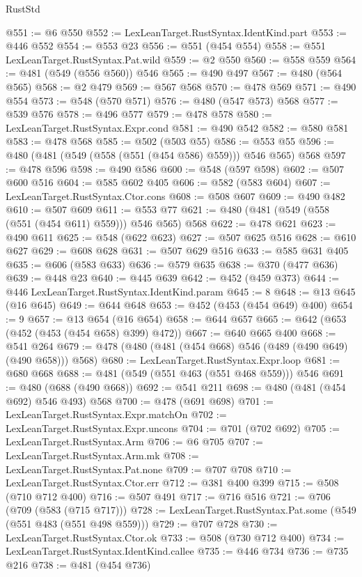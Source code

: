 \begin{lexlean}{RustStd}
\begin{coremodule}
@551 := @6 @550
@552 := LexLeanTarget.RustSyntax.IdentKind.part
@553 := @446 @552
@554 := @553 @23
@556 := @551 (@454 @554)
@558 := @551 LexLeanTarget.RustSyntax.Pat.wild
@559 := @2 @550
@560 := @558 @559
@564 := @481 (@549 (@556 @560)) @546
@565 := @490 @497
@567 := @480 (@564 @565)
@568 := @2 @479
@569 := @567 @568
@570 := @478 @569
@571 := @490 @554
@573 := @548 (@570 @571)
@576 := @480 (@547 @573) @568
@577 := @539 @576
@578 := @496 @577
@579 := @478 @578
@580 := LexLeanTarget.RustSyntax.Expr.cond
@581 := @490 @542
@582 := @580 @581
@583 := @478 @568
@585 := @502 (@503 @55)
@586 := @553 @55
@596 := @480 (@481 (@549 (@558 (@551 (@454 @586) @559))) @546 @565) @568
@597 := @478 @596
@598 := @490 @586
@600 := @548 (@597 @598)
@602 := @507 @600 @516
@604 := @585 @602 @405
@606 := @582 (@583 @604)
@607 := LexLeanTarget.RustSyntax.Ctor.cons
@608 := @508 @607
@609 := @490 @482
@610 := @507 @609
@611 := @553 @77
@621 := @480 (@481 (@549 (@558 (@551 (@454 @611) @559))) @546 @565) @568
@622 := @478 @621
@623 := @490 @611
@625 := @548 (@622 @623)
@627 := @507 @625 @516
@628 := @610 @627
@629 := @608 @628
@631 := @507 @629 @516
@633 := @585 @631 @405
@635 := @606 (@583 @633)
@636 := @579 @635
@638 := @370 (@477 @636)
@639 := @448 @23
@640 := @445 @639
@642 := @452 (@459 @373)
@644 := @446 LexLeanTarget.RustSyntax.IdentKind.param
@645 := 8
@648 := @13 @645 (@16 @645)
@649 := @644 @648
@653 := @452 (@453 (@454 @649) @400)
@654 := 9
@657 := @13 @654 (@16 @654)
@658 := @644 @657
@665 := @642 (@653 (@452 (@453 (@454 @658) @399) @472))
@667 := @640 @665 @400
@668 := @541 @264
@679 := @478 (@480 (@481 (@454 @668) @546 (@489 (@490 @649) (@490 @658))) @568)
@680 := LexLeanTarget.RustSyntax.Expr.loop
@681 := @680 @668
@688 := @481 (@549 (@551 @463 (@551 @468 @559))) @546
@691 := @480 (@688 (@490 @668))
@692 := @541 @211
@698 := @480 (@481 (@454 @692) @546 @493) @568
@700 := @478 (@691 @698)
@701 := LexLeanTarget.RustSyntax.Expr.matchOn
@702 := LexLeanTarget.RustSyntax.Expr.uncons
@704 := @701 (@702 @692)
@705 := LexLeanTarget.RustSyntax.Arm
@706 := @6 @705
@707 := LexLeanTarget.RustSyntax.Arm.mk
@708 := LexLeanTarget.RustSyntax.Pat.none
@709 := @707 @708
@710 := LexLeanTarget.RustSyntax.Ctor.err
@712 := @381 @400 @399
@715 := @508 (@710 @712 @400)
@716 := @507 @491
@717 := @716 @516
@721 := @706 (@709 (@583 (@715 @717)))
@728 := LexLeanTarget.RustSyntax.Pat.some (@549 (@551 @483 (@551 @498 @559)))
@729 := @707 @728
@730 := LexLeanTarget.RustSyntax.Ctor.ok
@733 := @508 (@730 @712 @400)
@734 := LexLeanTarget.RustSyntax.IdentKind.callee
@735 := @446 @734
@736 := @735 @216
@738 := @481 (@454 @736)

\end{coremodule}
\end{lexlean}
